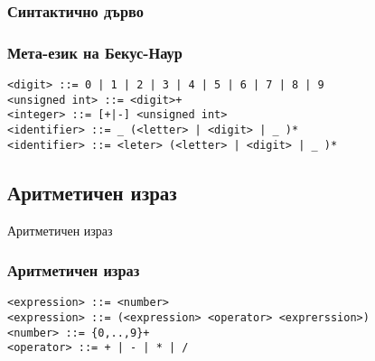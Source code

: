 \documentclass{beamer}
\begin{document}
  
  \begin{frame}[fragile]
  \frametitle{Синтактично дърво}
  
  
  \centering
  
  \end{frame}
  
  \begin{frame}[fragile]
  \frametitle{Мета-език на Бекус-Наур}
  
\begin{verbatim}
<digit> ::= 0 | 1 | 2 | 3 | 4 | 5 | 6 | 7 | 8 | 9 
<unsigned int> ::= <digit>+
<integer> ::= [+|-] <unsigned int>
<identifier> ::= _ (<letter> | <digit> | _ )* 
<identifier> ::= <leter> (<letter> | <digit> | _ )* 
\end{verbatim}
  
\end{frame}


\subsection{Аритметичен израз}
\begin{frame}
  \centerline{Аритметичен израз}
\end{frame}


\begin{frame}[fragile]
\frametitle{Аритметичен израз}

\begin{small}
\begin{verbatim}
<expression> ::= <number> 
<expression> ::= (<expression> <operator> <exprerssion>)
<number> ::= {0,..,9}+
<operator> ::= + | - | * | /
\end{verbatim}
\end{small}

\end{frame}  
\end{document}
